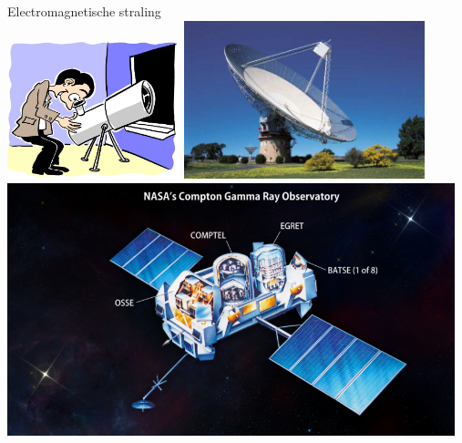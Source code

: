 \twocolumn
\begin{center}
{\blue Electromagnetische straling}\\[5mm]
\includegraphics[keepaspectratio,width=5cm]{optical2}
\includegraphics[keepaspectratio,width=7cm]{radio2}\\[1.8cm]
\includegraphics[keepaspectratio,width=13cm]{cgro2}
\end{center}

\newpage

